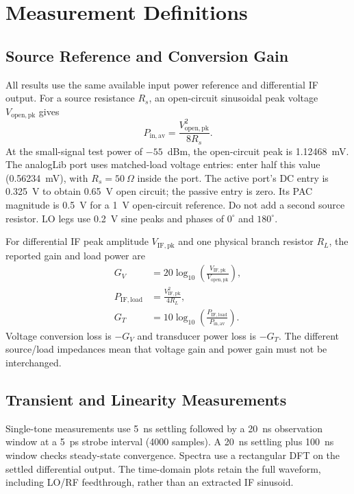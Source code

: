 \section{Measurement Definitions}
\subsection{Source Reference and Conversion Gain}
All results use the same available input power reference and differential IF
output. For a source resistance $R_s$, an open-circuit sinusoidal peak voltage
$V_{\mathrm{open,pk}}$ gives
\begin{equation}
P_{\mathrm{in,av}}=\frac{V_{\mathrm{open,pk}}^2}{8R_s}.
\label{eq:pin}\end{equation}
At the small-signal test power of $-55$~dBm, the open-circuit peak is
1.12468~mV. The analogLib port uses matched-load voltage entries: enter half
this value (0.56234~mV), with $R_s=50~\Omega$ inside the port. The active
port's DC entry is 0.325~V to obtain 0.65~V open circuit; the passive entry is
zero. Its PAC magnitude is 0.5~V for a 1~V open-circuit reference. Do not add a
second source resistor. LO legs use 0.2~V sine peaks and phases of
$0^\circ$ and $180^\circ$.

For differential IF peak amplitude $V_{\mathrm{IF,pk}}$ and one physical
branch resistor $R_L$, the reported gain and load power are
\begin{align}
G_V &=20\log_{10}\!\left(\frac{V_{\mathrm{IF,pk}}}{V_{\mathrm{open,pk}}}\right),
\label{eq:gv}\\
P_{\mathrm{IF,load}}&=\frac{V_{\mathrm{IF,pk}}^2}{4R_L},
\label{eq:pout}\\
G_T&=10\log_{10}\!\left(\frac{P_{\mathrm{IF,load}}}{P_{\mathrm{in,av}}}\right).
\label{eq:gt}\end{align}
Voltage conversion loss is $-G_V$ and transducer power loss is $-G_T$.
The different source/load impedances mean that voltage gain and power gain
must not be interchanged.

\subsection{Transient and Linearity Measurements}
Single-tone measurements use 5~ns settling followed by a 20~ns observation
window at a 5~ps strobe interval (4000 samples). A 20~ns settling plus 100~ns
window checks steady-state convergence. Spectra use a rectangular DFT on the
settled differential output. The time-domain plots retain the full waveform,
including LO/RF feedthrough, rather than an extracted IF sinusoid.

